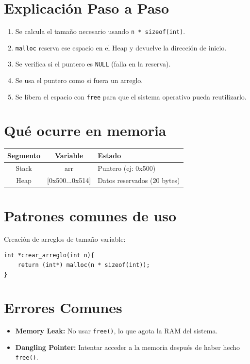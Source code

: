 \documentclass[12pt,a4paper]{article}
\begin{document}
\section{Explicación Paso a Paso}
\begin{enumerate}
    \item Se calcula el tamaño necesario usando \texttt{n * sizeof(int)}.
    \item \texttt{malloc} reserva ese espacio en el Heap y devuelve la dirección de inicio.
    \item Se verifica si el puntero es \texttt{NULL} (falla en la reserva).
    \item Se usa el puntero como si fuera un arreglo.
    \item Se libera el espacio con \texttt{free} para que el sistema operativo pueda reutilizarlo.
\end{enumerate}

\section{Qué ocurre en memoria}
\begin{center}
\begin{tabular}{|c|c|l|}
\hline
\textbf{Segmento} & \textbf{Variable} & \textbf{Estado} \\ \hline
Stack & arr & Puntero (ej: 0x500) \\ \hline
Heap & [0x500...0x514] & Datos reservados (20 bytes) \\ \hline
\end{tabular}
\end{center}

\section{Patrones comunes de uso}
Creación de arreglos de tamaño variable:
\begin{lstlisting}
int *crear_arreglo(int n){
    return (int*) malloc(n * sizeof(int));
}
\end{lstlisting}

\section{Errores Comunes}
\begin{itemize}
    \item \textbf{Memory Leak:} No usar \texttt{free()}, lo que agota la RAM del sistema.
    \item \textbf{Dangling Pointer:} Intentar acceder a la memoria después de haber hecho \texttt{free()}.
\end{itemize}
\end{document}
